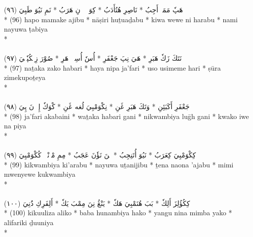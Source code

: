 \documentclass[a4paper, 12pt]{report}
\begin{document}
\begin{center}
\textarabic{(٩٦) \textcolor{mygreen}{هَپٗ مَمَكٖ أَجِبُ  * نَاصِرِ هُتُأَدَبُ  * كِوَ وٖوٖ نِ هَرَبُ  * نَمِ نَيُوَ طَبِيَ }} \\* 
(96) hapo mamake ajibu  * nāṣiri huṯuaḏabu  * kiwa wewe ni harabu  * nami nayuwa ṭabiya  \\* 
 \\ 
\\[8mm] 

\textarabic{(٩٧) \textcolor{mygreen}{نَتَكَ زَكٗ هَبَرِ  * هَيَ نِپَ جَعْفَرِ  * أُسٗ أُسِمٖمٖ هَرِ  * صُوْرَ زِمٖكُپٗتٖيَ }} \\* 
(97) naṯaka zako habari  * haya nipa ja'fari  * uso usimeme hari  * ṣūra zimekupoṯeya  \\* 
 \\ 
\\[8mm] 

\textarabic{(٩٨) \textcolor{mygreen}{جَعْفَرِ أَكَبَئِنِ  * وَتَكَ هَبَرِ ڠَنِ  * نِكْوَمْبِيَ لُغه ڠَنِ  * كْوَكٗ إِوٖ نَ پِيَ }} \\* 
(98) ja'fari akabaini  * waṯaka habari gani  * nikwambiya luḡh gani  * kwako iwe na piya  \\* 
 \\ 
\\[8mm] 

\textarabic{(٩٩) \textcolor{mygreen}{كِكْوَمْبِيَ كِعَرَبُ  * نَيُوَ أُتَنِجِبُ  * تٖنَ نَؤٗنَ عَجَبُ  * مِمِ مْوٖنْيٖوٖ كُكْوَمْبِيَ }} \\* 
(99) kikwambiya ki'arabu  * nayuwa uṯanijibu  * ṯena naona 'ajabu  * mimi mwenyewe kukwambiya  \\* 
 \\ 
\\[8mm] 

\textarabic{(١٠٠) \textcolor{mygreen}{كِكُؤُلِزَ أَلِكٗ  * بَبَ هُنَمْبِيَ هَكٗ  * يَنْڠُ نِنَ مِمْبَ يَكٗ  * أَلِفَرِكِ دُُنِيَ }} \\* 
(100) kikuuliza aliko  * baba hunambiya hako  * yangu nina mimba yako  * alifariki ḏuuniya  \\* 
 \\ 
\\[8mm] 


\end{center}
\end{document}
